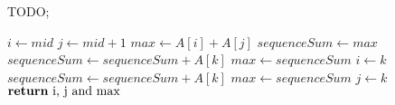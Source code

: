 \documentclass{article}
\begin{document}
\begin{algorithm}[H]
    \caption{
        TODO;
    }
    \label{alg:algorithm-label}
    \begin{algorithmic}[1]
            \State $ i \gets mid $
            \State $ j \gets mid + 1 $
            \State $ max \gets A[i] + A[j] $
            \State $ sequenceSum \gets max $
            \\            
                \State $ sequenceSum \gets sequenceSum + A[k] $
                    \State $ max \gets sequenceSum $
                    \State $ i \gets k $
                \EndIf
            \EndFor
            \\
                \State $ sequenceSum \gets sequenceSum + A[k] $
                    \State $ max \gets sequenceSum $
                    \State $ j \gets k $
                \EndIf
            \EndFor
            \\
            \State $ \Return \text{ i, j and max} $            
        \EndFunction
    \end{algorithmic}
\end{algorithm}
\end{document}
